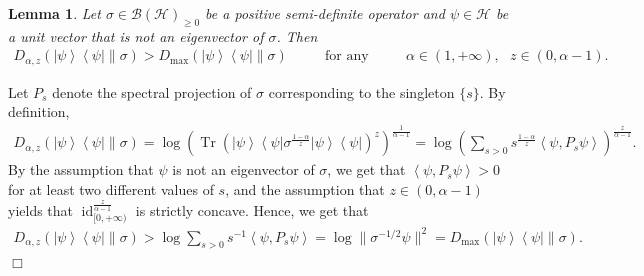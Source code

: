 \documentclass[unsortedaddress,superscriptaddress,pra,notitlepage]{revtex4}
\newtheorem{lemma}[definition]{Lemma}
\newenvironment{proof}[1][Proof]{\begin{trivlist}
\item[\hskip \labelsep {\bfseries #1}]}{\hfill$\Box$\end{trivlist}}
\def\B{{\mathcal B}}
\def\hil{{\mathcal H}}
\def\bz{\left(}
\def\jz{\right)}
\def\inv{^{-1}}
\def\p{_{\ge 0}}
\newcommand{\s}{\mbox{ }}
\newcommand{\ds}{\mbox{ }\mbox{ }}
\newcommand{\snorm}[1]{\| #1\|}
\newcommand{\inner}[2]{\left\langle #1 , #2\right\rangle}
\newcommand{\diad}[2]{\left|#1\right\rangle\!\left\langle #2\right|}
\newcommand{\pr}[1]{\diad{#1}{#1}}
\DeclareMathOperator{\id}{id}
\DeclareMathOperator{\Tr}{Tr}
\begin{document}
\begin{lemma}\label{lemma:no Dmax bound}
Let $\sigma\in\B(\hil)\p$ be a positive semi-definite operator and $\psi\in\hil$ be a unit vector 
that is not an eigenvector of $\sigma$. Then 
\begin{align*}
D_{\alpha,z}(\pr{\psi}\|\sigma)> D_{\max}(\pr{\psi}\|\sigma)\ds\ds\text{for any}\ds\ds
\alpha\in(1,+\infty),\s z\in(0,\alpha-1).
\end{align*}
\end{lemma}
\begin{proof}
Let $P_s$ denote the spectral projection of $\sigma$ corresponding to the singleton 
$\{s\}$. 
By definition,
\begin{align*}
D_{\alpha,z}(\pr{\psi}\|\sigma)
=
\log\bz\Tr\bz\pr{\psi}\sigma^{\frac{1-\alpha}{z}}\pr{\psi}\jz^z\jz^{\frac{1}{\alpha-1}}
=
\log\bz\sum_{s>0}s^{\frac{1-\alpha}{z}}\inner{\psi}{P_s\psi}\jz^{\frac{z}{\alpha-1}}.
\end{align*}
By the assumption that $\psi$ is not an eigenvector of $\sigma$, we get that 
$\inner{\psi}{P_s\psi}>0$ for at least two different values of $s$, 
and the assumption that $z\in(0,\alpha-1)$ yields that 
$\id_{[0,+\infty)}^{\frac{z}{\alpha-1}}$ is strictly concave. 
Hence, we get that 
\begin{align*}
D_{\alpha,z}(\pr{\psi}\|\sigma)
>
\log\sum_{s>0}s\inv\inner{\psi}{P_s\psi}
=
\log\snorm{\sigma^{-1/2}\psi}^2
=
D_{\max}(\pr{\psi}\|\sigma).
\end{align*}
\end{proof}
\end{document}
